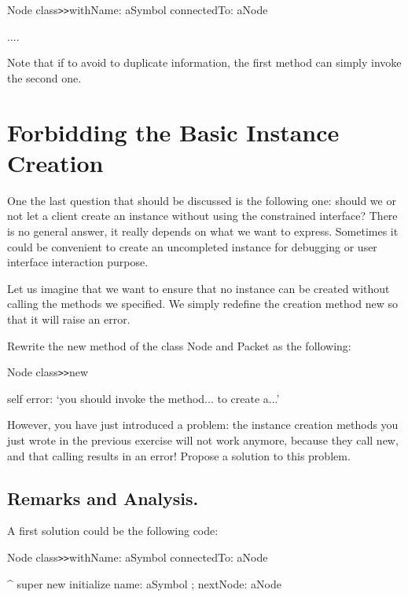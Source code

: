 \begin{code}
 Node class\texttt{>>}withName: aSymbol connectedTo: aNode

....
\end{code}

Note that if to avoid to duplicate information, the first method 
can simply invoke the second one.



\section{Forbidding the Basic Instance Creation}


One the last question that should be discussed is the following 
one: should we or not let a client create an instance without 
using the constrained interface? There is no general answer, 
it really depends on what we want to express. Sometimes it could 
be convenient to create an uncompleted instance for debugging 
or user interface interaction purpose. 

Let us imagine that we want to ensure that no instance can be 
created without calling the methods we specified. We simply redefine 
the creation method new so that it will raise an error.

Rewrite the new method of the class Node and Packet as the following:

\begin{code}
Node class\texttt{>>}new

\tab \tab self error: `you should invoke the method... to create a...' 
\end{code}

However, you have just introduced a problem: the instance creation 
methods you just wrote in the previous exercise will not work 
anymore, because they call new, and that calling results in an 
error! Propose a solution to this problem.



\subsection{ Remarks and Analysis.}


A first solution could be the following code: 

\begin{code}
 Node class\texttt{>>}withName: aSymbol connectedTo: aNode

      ^ super new initialize name: aSymbol ; nextNode: aNode
\end{code}

